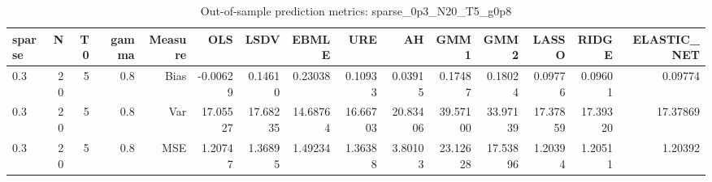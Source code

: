 \begin{table}[!htbp]\centering
\caption{Out-of-sample prediction metrics: sparse_0p3_N20_T5_g0p8}
\label{tab:table3_sparse_0p3_N20_T5_g0p8}
\begin{tabular}{lrrrrrrrrrrrrrr}
\hline
sparse & N & T0 & gamma & Measure & OLS & LSDV & EBMLE & URE & AH & GMM1 & GMM2 & LASSO & RIDGE & ELASTIC_NET \\
\hline
0.3 & 20 & 5 & 0.8 & Bias & -0.00629 & 0.14610 & 0.23038 & 0.10933 & 0.03915 & 0.17487 & 0.18024 & 0.09776 & 0.09601 & 0.09774 \\
0.3 & 20 & 5 & 0.8 & Var & 17.05527 & 17.68235 & 14.68764 & 16.66703 & 20.83406 & 39.57100 & 33.97139 & 17.37859 & 17.39320 & 17.37869 \\
0.3 & 20 & 5 & 0.8 & MSE & 1.20747 & 1.36895 & 1.49234 & 1.36388 & 3.80103 & 23.12628 & 17.53896 & 1.20394 & 1.20511 & 1.20392 \\
\hline
\end{tabular}
\end{table}

